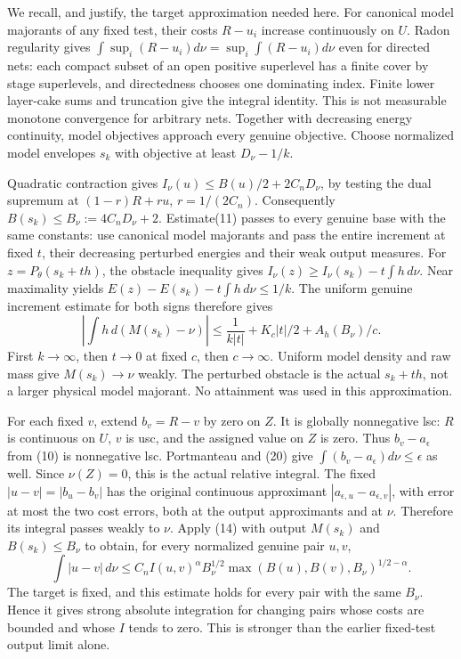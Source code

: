 \documentclass[11pt]{article}
\begin{document}
We recall, and justify, the target approximation needed here.
For canonical model majorants of any fixed test, their costs
$R-u_i$ increase continuously on $U$. Radon regularity gives
$\int\sup_i(R-u_i)d\nu=\sup_i\int(R-u_i)d\nu$ even for directed
nets: each compact subset of an open positive superlevel has a finite
cover by stage superlevels, and directedness chooses one dominating
index. Finite lower layer-cake sums and truncation give the integral
identity. This is not measurable monotone convergence for arbitrary nets.
Together with decreasing energy continuity, model objectives approach
every genuine objective. Choose normalized model envelopes $s_k$
with objective at least $D_\nu-1/k$.

Quadratic contraction gives
$I_\nu(u)\leq B(u)/2+2C_nD_\nu$, by testing the dual supremum at
$(1-r)R+ru$, $r=1/(2C_n)$.
Consequently $B(s_k)\leq B_\nu:=4C_nD_\nu+2$.
Estimate(11) passes to every genuine base with the same constants:
use canonical model majorants and pass the entire increment at fixed
$t$, their decreasing perturbed energies and their weak output measures.
For $z=P_\theta(s_k+th)$, the obstacle inequality gives
$I_\nu(z)\geq I_\nu(s_k)-t\int h\,d\nu$.
Near maximality yields
$E(z)-E(s_k)-t\int h\,d\nu\leq1/k$.
The uniform genuine increment estimate for both signs therefore gives
\[
 \left|\int h\,d(M(s_k)-\nu)\right|
 \leq\frac1{k|t|}+K_c|t|/2+A_h(B_\nu)/c.                 \tag{20}
\]
First $k\to\infty$, then $t\to0$ at fixed $c$, then $c\to\infty$.
Uniform model density and raw mass give $M(s_k)\to\nu$ weakly.
The perturbed obstacle is the actual $s_k+th$, not a larger physical
model majorant. No attainment was used in this approximation.

For each fixed $v$, extend $b_v=R-v$ by zero on $Z$. It is globally
nonnegative lsc: $R$ is continuous on $U$, $v$ is usc, and the assigned
value on $Z$ is zero. Thus $b_v-a_\epsilon$ from (10) is nonnegative
lsc. Portmanteau and (20) give
$\int(b_v-a_\epsilon)d\nu\leq\epsilon$ as well.
Since $\nu(Z)=0$, this is the actual relative integral.
The fixed $|u-v|=|b_u-b_v|$ has the original continuous approximant
$|a_{\epsilon,u}-a_{\epsilon,v}|$, with error at most the two
cost errors, both at the output approximants and at $\nu$.
Therefore its integral passes weakly to $\nu$.
Apply (14) with output $M(s_k)$ and $B(s_k)\leq B_\nu$ to obtain,
for every normalized genuine pair $u,v$,
\[
 \int|u-v|\,d\nu\leq C_n I(u,v)^\alpha B_\nu^{1/2}
                    \max(B(u),B(v),B_\nu)^{1/2-\alpha}.   \tag{21}
\]
The target is fixed, and this estimate holds for every pair with the
same $B_\nu$. Hence it gives strong absolute integration for changing
pairs whose costs are bounded and whose $I$ tends to zero. This is
stronger than the earlier fixed-test output limit alone.
\end{document}
